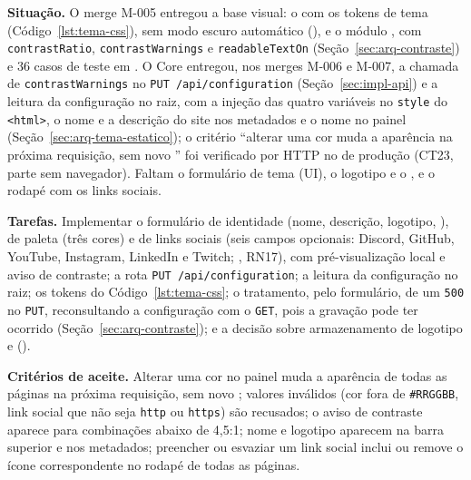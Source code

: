 \textbf{Situação.} O merge M-005 entregou a base visual: o  com os tokens de tema (Código~\ref{lst:tema-css}), sem modo escuro automático (), e o módulo , com \texttt{contrastRatio}, \texttt{contrastWarnings} e \texttt{readableTextOn} (Seção~\ref{sec:arq-contraste}) e 36 casos de teste em . O Core entregou, nos merges M-006 e M-007, a chamada de \texttt{contrastWarnings} no \texttt{PUT /api/configuration} (Seção~\ref{sec:impl-api}) e a leitura da configuração no  raiz, com a injeção das quatro variáveis no \texttt{style} do \texttt{<html>}, o nome e a descrição do site nos metadados e o nome no painel (Seção~\ref{sec:arq-tema-estatico}); o critério ``alterar uma cor muda a aparência na próxima requisição, sem novo '' foi verificado por HTTP no  de produção (CT23, parte sem navegador). Faltam o formulário de tema (UI), o logotipo e o , e o rodapé com os links sociais.

\textbf{Tarefas.} Implementar o formulário de identidade (nome, descrição, logotipo, ), de paleta (três cores) e de links sociais (seis campos opcionais: Discord, GitHub, YouTube, Instagram, LinkedIn e Twitch; , RN17), com pré-visualização local e aviso de contraste; a rota \texttt{PUT /api/configuration}; a leitura da configuração no  raiz; os tokens do Código~\ref{lst:tema-css}; o tratamento, pelo formulário, de um \texttt{500} no \texttt{PUT}, reconsultando a configuração com o \texttt{GET}, pois a gravação pode ter ocorrido (Seção~\ref{sec:arq-contraste}); e a decisão sobre armazenamento de logotipo e  ().

\textbf{Critérios de aceite.} Alterar uma cor no painel muda a aparência de todas as páginas na próxima requisição, sem novo ; valores inválidos (cor fora de \texttt{\#RRGGBB}, link social que não seja \texttt{http} ou \texttt{https}) são recusados; o aviso de contraste aparece para combinações abaixo de 4,5:1; nome e logotipo aparecem na barra superior e nos metadados; preencher ou esvaziar um link social inclui ou remove o ícone correspondente no rodapé de todas as páginas.



